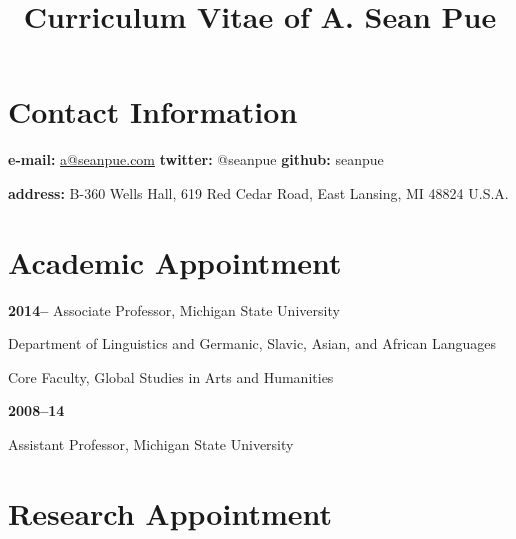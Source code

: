 \documentclass[letterpaper,12pt]{article}
\title{\phantomsection%
  Curriculum Vitae of A. Sean Pue%
  \label{curriculum-vitae-of-a-sean-pue}}
\author{}
\date{}
\newenvironment{DUlineblock}[1]{%
    \list{}{\setlength{\partopsep}{\parskip}
            \addtolength{\partopsep}{\baselineskip}
            \setlength{\topsep}{0pt}
            \setlength{\itemsep}{0.15\baselineskip}
            \setlength{\parsep}{0pt}
            \setlength{\leftmargin}{#1}}
    \raggedright
  }
  {\endlist}
\begin{document}
\maketitle


\section{Contact Information%
  \label{contact-information}%
}

\begin{DUlineblock}{0em}
\item[] \textbf{e-mail:}
\href{mailto:a@seanpue.com}{a@seanpue.com}
\textbf{twitter:}
@seanpue
\textbf{github:}
seanpue
\item[] \textbf{address:}
B-360 Wells Hall, 619 Red Cedar Road, East Lansing, MI 48824 U.S.A.
\end{DUlineblock}


\section{Academic Appointment%
  \label{academic-appointment}%
}

\begin{DUlineblock}{0em}
\item[] \textbf{2014–}
Associate Professor, Michigan State University
\item[]
\begin{DUlineblock}{\DUlineblockindent}
\item[] Department of Linguistics and Germanic, Slavic, Asian, and African Languages
\item[] Core Faculty, Global Studies in Arts and Humanities
\end{DUlineblock}
\end{DUlineblock}

\begin{DUlineblock}{0em}
\item[] \textbf{2008–14}
\item[]
\begin{DUlineblock}{\DUlineblockindent}
\item[] Assistant Professor, Michigan State University
\item[] 
\end{DUlineblock}
\end{DUlineblock}


\section{Research Appointment%
  \label{research-appointment}%
}
\end{document}
